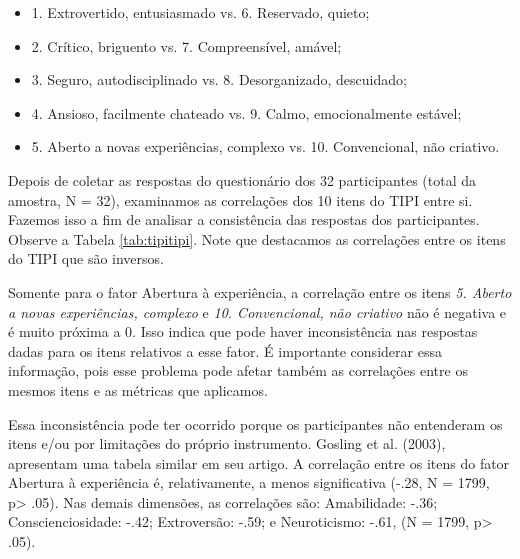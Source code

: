 \begin{itemize}
\item 1. Extrovertido, entusiasmado vs. 6. Reservado, quieto;
\item 2. Crítico, briguento vs. 7. Compreensível, amável;
\item 3. Seguro, autodisciplinado vs. 8. Desorganizado, descuidado;
\item 4. Ansioso, facilmente chateado vs. 9. Calmo, emocionalmente estável;
\item 5. Aberto a novas experiências, complexo vs. 10. Convencional, não criativo.
\end{itemize}

Depois de coletar as respostas do questionário dos 32 participantes (total da amostra, N = 32),
examinamos as correlações dos 10 itens do TIPI entre si.
Fazemos isso a fim de analisar a consistência das respostas dos participantes. Observe a Tabela \ref{tab:tipitipi}.
Note que destacamos as correlações entre os itens do TIPI que são inversos. 


Somente para o fator Abertura à experiência, a correlação entre os itens \textit{5. Aberto a novas experiências, complexo} e \textit{10. Convencional, não criativo} não é negativa e é muito próxima a 0. Isso indica que pode haver inconsistência nas respostas dadas para os itens relativos a esse fator.
É importante considerar essa informação, pois esse problema pode afetar também as correlações entre os mesmos itens e as métricas que aplicamos.

Essa inconsistência pode ter ocorrido porque os participantes não entenderam os itens e/ou por limitações do próprio instrumento. Gosling et al. (2003)\nocite{gosling:03}, apresentam uma tabela similar em seu artigo. A correlação entre os itens do fator Abertura à experiência é, relativamente, a menos significativa (-.28, N = 1799, p> .05).
Nas demais dimensões, as correlações são: Amabilidade: -.36; Conscienciosidade: -.42; Extroversão: -.59; e Neuroticismo: -.61, (N = 1799, p> .05).

